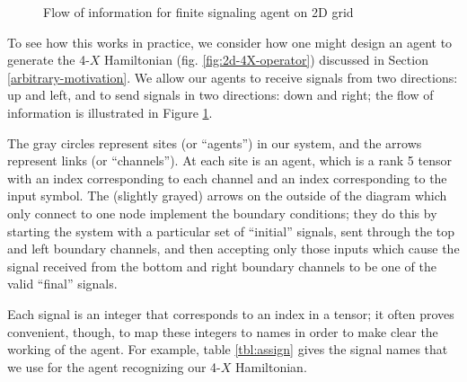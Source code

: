 \documentclass[12pt]{amsbook}
\theoremstyle{plain}
\theoremstyle{definition}
\theoremstyle{remark}
\begin{document}
\begin{figure}
\caption{Flow of information for finite signaling agent on 2D grid}
\label{fig:2d-information-flow}
\end{figure}

To see how this works in practice, we consider how one might design an agent to generate the 4-$X$ Hamiltonian (fig. \ref{fig:2d-4X-operator}) discussed in Section \ref{arbitrary-motivation}.  We allow our agents to receive signals from two directions: up and left, and to send signals in two directions:  down and right;  the flow of information is illustrated in Figure \ref{fig:2d-information-flow}.

The gray circles represent sites (or ``agents'') in our system, and the arrows represent links (or ``channels'').  At each site is an agent, which is a rank 5 tensor with an index corresponding to each channel and an index corresponding to the input symbol.  The (slightly grayed) arrows on the outside of the diagram which only connect to one node implement the boundary conditions;  they do this by starting the system with a particular set of ``initial'' signals, sent through the top and left boundary channels, and then accepting only those inputs which cause the signal received from the bottom and right boundary channels to be one of the valid ``final'' signals.

Each signal is an integer that corresponds to an index in a tensor;  it often proves convenient, though, to map these integers to names in order to make clear the working of the agent.  For example, table \ref{tbl:assign} gives the signal names that we use for the agent recognizing our 4-$X$ Hamiltonian.
\end{document}
